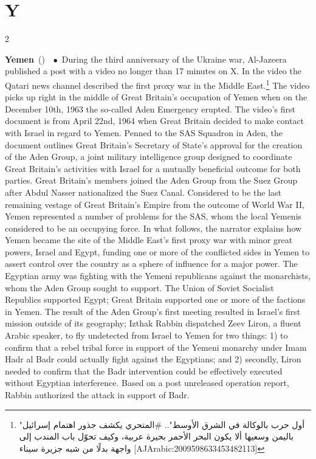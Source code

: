 \documentclass[10pt,a4paper,twoside]{article} %
\newcommand{\entry}[4]{\markboth{#1}{#1}\textbf{#1}\ {(#2)}\ \textit{#3}\ $\bullet$\ {#4}}  %
\begin{document}

\section*{Y}

\begin{multicols}{2}

\entry{Yemen} {} {} {During the third anniversary of the Ukraine war, Al-Jazeera published a post with a video no longer than 17 minutes on X. In the video the Qatari news channel described the first proxy war in the Middle East.\footnote{\textarabic{"أول حرب بالوكالة في الشرق الأوسط".. #المتحري يكشف جذور اهتمام إسرائيل باليمن وسعيها ألا يكون البحر الأحمر بحيرة عربية، وكيف تحوّل باب المندب إلى واجهة بدلًا من شبه جزيرة سيناء} [AJArabic:2009598633453482113]}  The video picks up right in the middle of Great Britain's occupation of Yemen when on the December 10th, 1963 the so-called Aden Emergency erupted. The video's first document is from April 22nd, 1964 when Great Britain decided to make contact with Israel in regard to Yemen. Penned to the SAS Squadron in Aden, the document outlines Great Britain's Secretary of State's approval for the creation of the Aden Group, a joint military intelligence group designed to coordinate Great Britain's activities with Israel for a mutually beneficial outcome for both parties. Great Britain's members joined the Aden Group from the Suez Group after Abdul Nasser nationalized the Suez Canal. Considered to be the last remaining vestage of Great Britain's Empire from the outcome of World War II, Yemen represented a number of problems for the SAS, whom the local Yemenis considered to be an occupying force. In what follows, the narrator explains how Yemen became the site of the Middle East's first proxy war with minor great powers, Israel and Egypt, funding one or more of the conflicted sides in Yemen to assert control over the country as a sphere of influence for a major power. The Egyptian army was fighting with the Yemeni republicans against the monarchists, whom the Aden Group sought to support. The Union of Soviet Socialist Republics supported Egypt; Great Britain supported one or more of the factions in Yemen.
\newline \indent The result of the Aden Group's first meeting resulted in Israel's first mission outside of its geography; Izthak Rabbin dispatched Zeev Liron, a fluent Arabic speaker, to fly undetected from Israel to Yemen for two things: 1) to confirm that a rebel tribal force in support of the Yemeni monarchy under Imam Hadr al Badr could actually fight against the Egyptians; and 2) secondly, Liron needed to confirm that the Badr intervention could be effectively executed without Egyptian interference. Based on a post unreleased operation report, Rabbin authorized the attack in support of Badr. 
}
\end{multicols}
\end{document}
